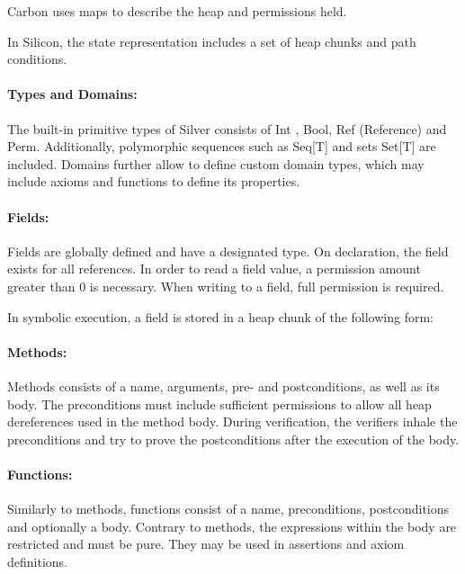 \documentclass[12pt]{article}
\begin{document}
Carbon uses maps to describe the heap and permissions held. 

In Silicon, the state representation includes a set of heap chunks and path conditions.

\paragraph{Types and Domains: }
The built-in primitive types of Silver consists of  Int , Bool, Ref (Reference) and Perm.  Additionally,  polymorphic sequences such as Seq[T] and sets Set[T] are included. Domains further allow to define custom domain types, which may include axioms and functions to define its properties.

\paragraph{Fields: }
Fields are globally defined and have a designated type. On declaration, the field exists for all references. In order to read a field value, a permission amount greater than 0 is necessary. When writing to a field, full permission is required.

In symbolic execution, a field is stored in a heap chunk of the following form:


\paragraph{Methods: }
Methods consists of a name, arguments, pre- and postconditions, as well as its body. The preconditions must include sufficient permissions to allow all heap dereferences used in the method body. During verification, the verifiers inhale the preconditions and try to prove the postconditions after the execution of the body.

\paragraph{Functions: }
Similarly to methods, functions consist of a name, preconditions, postconditions and optionally a body. Contrary to methods, the expressions within the body are restricted and must be pure. They may be used in assertions and axiom definitions.
\end{document}
